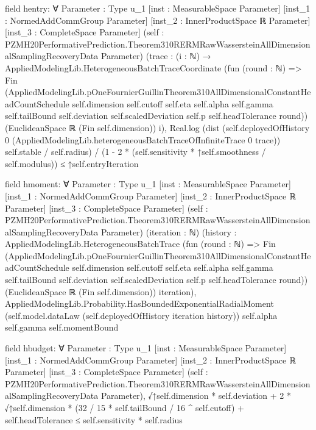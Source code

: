 \documentclass[10pt]{article}
\begin{document}
\begin{ReviewVerbatim}
field hentry:
∀ {Parameter : Type u_1} [inst : MeasurableSpace Parameter] [inst_1 : NormedAddCommGroup Parameter]
  [inst_2 : InnerProductSpace ℝ Parameter] [inst_3 : CompleteSpace Parameter]
  (self : PZMH20PerformativePrediction.Theorem310RERMRawWassersteinAllDimensionalSamplingRecoveryData Parameter)
  (trace :
    (i : ℕ) →
      AppliedModelingLib.HeterogeneousBatchTraceCoordinate
        (fun (round : ℕ) =>
          Fin
            (AppliedModelingLib.pOneFournierGuillinTheorem310AllDimensionalConstantHeadCountSchedule self.dimension
              self.cutoff self.eta self.alpha self.gamma self.tailBound self.deviation self.scaledDeviation self.p
              self.headTolerance round))
        (EuclideanSpace ℝ (Fin self.dimension)) i),
  Real.log
        (dist (self.deployedOfHistory 0 (AppliedModelingLib.heterogeneousBatchTraceOfInfiniteTrace 0 trace))
            self.stable /
          self.radius) /
      (1 - 2 * (self.sensitivity * ↑self.smoothness / self.modulus)) ≤
    ↑self.entryIteration

field hmoment:
∀ {Parameter : Type u_1} [inst : MeasurableSpace Parameter] [inst_1 : NormedAddCommGroup Parameter]
  [inst_2 : InnerProductSpace ℝ Parameter] [inst_3 : CompleteSpace Parameter]
  (self : PZMH20PerformativePrediction.Theorem310RERMRawWassersteinAllDimensionalSamplingRecoveryData Parameter)
  (iteration : ℕ)
  (history :
    AppliedModelingLib.HeterogeneousBatchTrace
      (fun (round : ℕ) =>
        Fin
          (AppliedModelingLib.pOneFournierGuillinTheorem310AllDimensionalConstantHeadCountSchedule self.dimension
            self.cutoff self.eta self.alpha self.gamma self.tailBound self.deviation self.scaledDeviation self.p
            self.headTolerance round))
      (EuclideanSpace ℝ (Fin self.dimension)) iteration),
  AppliedModelingLib.Probability.HasBoundedExponentialRadialMoment
    (self.model.dataLaw (self.deployedOfHistory iteration history)) self.alpha self.gamma self.momentBound

field hbudget:
∀ {Parameter : Type u_1} [inst : MeasurableSpace Parameter] [inst_1 : NormedAddCommGroup Parameter]
  [inst_2 : InnerProductSpace ℝ Parameter] [inst_3 : CompleteSpace Parameter]
  (self : PZMH20PerformativePrediction.Theorem310RERMRawWassersteinAllDimensionalSamplingRecoveryData Parameter),
  √↑self.dimension * self.deviation + 2 * √↑self.dimension * (32 / 15 * self.tailBound / 16 ^ self.cutoff) +
      self.headTolerance ≤
    self.sensitivity * self.radius


\end{ReviewVerbatim}
\end{document}
